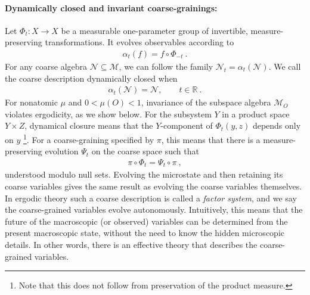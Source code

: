 \documentclass[a4paper,11pt]{article}
\theoremstyle{definition}
\begin{document}
\paragraph{Dynamically closed and invariant coarse-grainings:}
Let $\Phi_t:X\to X$ be a measurable one-parameter group of invertible, measure-preserving transformations. It evolves observables according to
\begin{align}
    \alpha_t(f)=f\circ\Phi_{-t}\ .
\end{align}
For any coarse algebra $\mathcal N\subseteq\mathcal M$, we can follow the family $\mathcal N_t=\alpha_t(\mathcal N)$. We call the coarse description dynamically closed when
\begin{align}\label{eq:classical-coarse-invariance}
    \alpha_t(\mathcal N)=\mathcal N,\qquad t\in\mathbb R\ .
\end{align}
For nonatomic $\mu$ and $0<\mu(O)<1$, invariance of the subspace algebra $\mathcal M_O$ violates ergodicity, as we show below.
For the subsystem $Y$ in a product space $Y\times Z$, dynamical closure means that the $Y$-component of $\Phi_t(y,z)$ depends only on $y$ \footnote{Note that this does not follow from preservation of the product measure.}. For a coarse-graining specified by $\pi$, this means that there is a measure-preserving evolution $\Psi_t$ on the coarse space such that
\begin{align}\label{eq:classical-factor-intertwining}
    \pi\circ\Phi_t=\Psi_t\circ\pi\ ,
\end{align}
understood modulo null sets. Evolving the microstate and then retaining its coarse variables gives the same result as evolving the coarse variables themselves. In ergodic theory such a coarse description is called a {\it factor system}, and we say the coarse-grained variables evolve autonomously. Intuitively, this means that the future of the macroscopic (or observed) variables can be determined from the present macroscopic state, without the need to know the hidden microscopic details. In other words, there is an effective theory that describes the coarse-grained variables.


\end{document}

